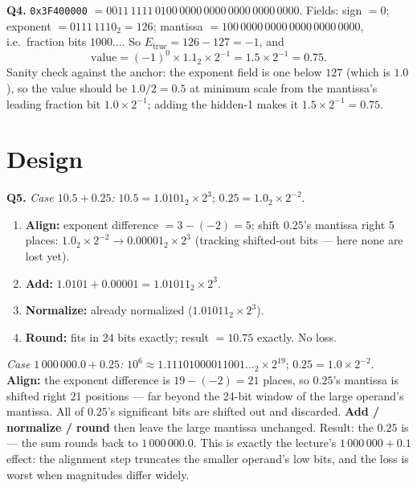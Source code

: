 \documentclass[11pt]{article}
\begin{document}
\textbf{Q4.} \texttt{0x3F400000} $= 0011\,1111\,0100\,0000\,0000\,0000\,0000\,0000$. Fields: sign $= 0$; exponent $= 0111\,1110_2 = 126$; mantissa $= 100\,0000\,0000\,0000\,0000\,0000$, i.e.\ fraction bits $1000\ldots$. So $E_{\text{true}} = 126 - 127 = -1$, and
\[
\text{value} = (-1)^0 \times 1.1_2 \times 2^{-1} = 1.5 \times 2^{-1} = 0.75.
\]
Sanity check against the anchor: the exponent field is one below $127$ (which is $1.0$), so the value should be $1.0/2 = 0.5$ at minimum scale from the mantissa's leading fraction bit $1.0 \times 2^{-1}$; adding the hidden-1 makes it $1.5 \times 2^{-1} = 0.75$. 

\section{Design}

\textbf{Q5.} \emph{Case $10.5 + 0.25$:} $10.5 = 1.0101_2 \times 2^3$; $0.25 = 1.0_2 \times 2^{-2}$. 
\begin{enumerate}
  \item \textbf{Align:} exponent difference $= 3 - (-2) = 5$; shift $0.25$'s mantissa right 5 places: $1.0_2 \times 2^{-2} \to 0.00001_2 \times 2^3$ (tracking shifted-out bits --- here none are lost yet).
  \item \textbf{Add:} $1.0101 + 0.00001 = 1.01011_2 \times 2^3$.
  \item \textbf{Normalize:} already normalized ($1.01011_2 \times 2^3$).
  \item \textbf{Round:} fits in 24 bits exactly; result $= 10.75$ exactly. No loss.
\end{enumerate}
\emph{Case $1\,000\,000.0 + 0.25$:} $10^6 \approx 1.11101000011001\ldots_2 \times 2^{19}$; $0.25 = 1.0 \times 2^{-2}$. \textbf{Align:} the exponent difference is $19 - (-2) = 21$ places, so $0.25$'s mantissa is shifted right 21 positions --- far beyond the 24-bit window of the large operand's mantissa. All of $0.25$'s significant bits are shifted out and discarded. \textbf{Add / normalize / round} then leave the large mantissa unchanged. Result: the $0.25$ is  --- the sum rounds back to $1\,000\,000.0$. This is exactly the lecture's $1\,000\,000 + 0.1$ effect: the alignment step truncates the smaller operand's low bits, and the loss is worst when magnitudes differ widely.
\end{document}
